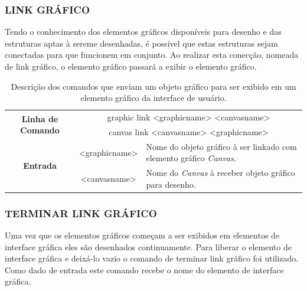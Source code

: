 \documentclass[a4paper,12pt]{monografia}
\theoremstyle{plain}
\theoremstyle{definition}
\theoremstyle{remark}
\begin{document}
\subsubsection{LINK GRÁFICO}\label{sec:graphic_link}

Tendo o conhecimento dos elementos gráficos disponíveis para desenho e das estruturas aptas à sereme desenhadas, é possível que estas estruturas sejam conectadas para que funcionem em conjunto. Ao realizar esta conecção, nomeada de link gráfico, o elemento gráfico passará a exibir o elemento gráfico.

\begin{center}
	\begin{table}[!htbp]
		\begin{tabular}{|c|c|m{}|}
			\hline
			\multirow{2}{*}{\textbf{Linha de Comando}} & \multicolumn{2}{c|}{graphic link <graphic\underline{\space\space}name> <canvas\underline{\space\space}name>} \\
			& \multicolumn{2}{c|}{canvas link <canvas\underline{\space\space}name> <graphic\underline{\space\space}name>} \\
			\hline
			\multirow{2}{*}{\textbf{Entrada}} &  <graphic\underline{\space\space}name> & Nome do objeto gráfico à ser linkado com elemento gráfico \textit{Canvas}. \\
			& <canvas\underline{\space\space}name> & Nome do \textit{Canvas} à receber objeto gráfico para desenho. \\
			\hline
		\end{tabular}
		\caption{Descrição dos comandos que enviam um objeto gráfico para ser exibido em um elemento gráfico da interface de usuário.}
		\label{tab:graphic_link}
	\end{table}
\end{center}

\subsubsection{TERMINAR LINK GRÁFICO}\label{sec:graphic_purge}

Uma vez que os elementos gráficos começam a ser exibidos em elementos de interface gráfica eles são desenhados continuamente. Para liberar o elemento de interface gráfica e deixá-lo vazio o comando de terminar link gráfico foi utilizado. Como dado de entrada este comando recebe o nome do elemento de interface gráfica.
\end{document}
